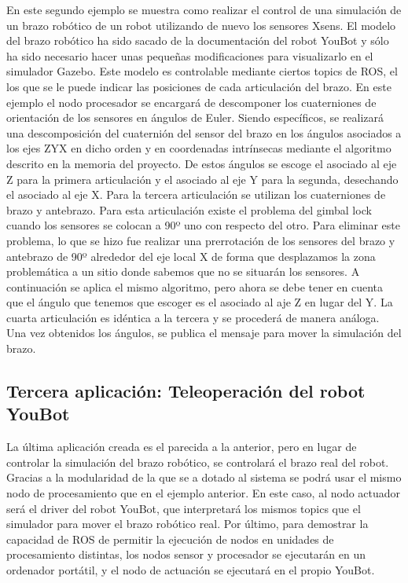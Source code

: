 \documentclass[12pt,a4paper]{article}
\begin{document}
En este segundo ejemplo se muestra como realizar el control de una simulación de un brazo robótico de un robot utilizando de nuevo los sensores Xsens. El modelo del brazo robótico ha sido sacado de la documentación del robot YouBot y sólo ha sido necesario hacer unas pequeñas modificaciones para visualizarlo en el simulador Gazebo. Este modelo es controlable mediante ciertos topics de ROS, el los que se le puede indicar las posiciones de cada articulación del brazo. En este ejemplo el nodo procesador se encargará de descomponer los cuaterniones de orientación de los sensores en ángulos de Euler. Siendo específicos, se realizará una descomposición del cuaternión del sensor del brazo en los ángulos asociados a los ejes ZYX en dicho orden y en coordenadas intrínsecas mediante el algoritmo descrito en la memoria del proyecto. De estos ángulos se escoge el asociado al eje Z para la primera articulación y el asociado al eje Y para la segunda, desechando el asociado al eje X. Para la tercera articulación se utilizan los cuaterniones de brazo y antebrazo. Para esta articulación existe el problema del gimbal lock cuando los sensores se colocan a 90º uno con respecto del otro. Para eliminar este problema, lo que se hizo fue realizar una prerrotación de los sensores del brazo y antebrazo de 90º alrededor del eje local X de forma que desplazamos la zona problemática a un sitio donde sabemos que no se situarán los sensores. A continuación se aplica el mismo algoritmo, pero ahora se debe tener en cuenta que el ángulo que tenemos que escoger es el asociado al aje Z en lugar del  Y. La cuarta articulación es idéntica a la tercera y se procederá de manera análoga. Una vez obtenidos los ángulos, se publica el mensaje para mover la simulación del brazo.

\subsection{Tercera aplicación: Teleoperación del robot YouBot}

La última aplicación creada es el parecida a la anterior, pero en lugar de controlar la simulación del brazo robótico, se controlará el brazo real del robot. Gracias a la modularidad de la que se a dotado al sistema se podrá usar el mismo nodo de procesamiento que en el ejemplo anterior. En este caso, al nodo actuador será el driver del robot YouBot, que interpretará los mismos topics que el simulador para mover el brazo robótico real. Por último, para demostrar la capacidad de ROS de permitir la ejecución de nodos en unidades de procesamiento distintas, los nodos sensor y procesador se ejecutarán en un ordenador portátil, y el nodo de actuación se ejecutará en el propio YouBot. 
\end{document}
